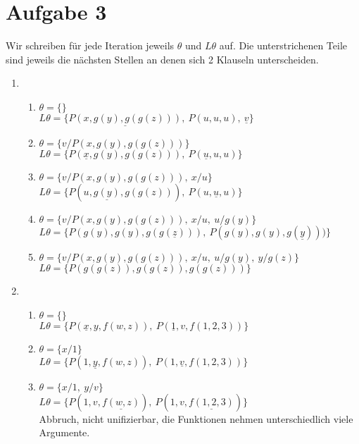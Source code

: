 \documentclass[a4paper,10pt]{article}
\begin{document}
\section*{Aufgabe 3}
Wir schreiben für jede Iteration jeweils $\theta$ und $L\theta$ auf. Die unterstrichenen Teile sind jeweils die nächsten Stellen an denen sich 2 Klauseln unterscheiden.

\begin{enumerate}[~~a)]
    \item
    \begin{enumerate}[~~1.]
      \item $\theta = \{\}$\\
            $L\theta = \{ \underline{P(x, g(y), g(g(z)))},~ P(u, u, u),~ \underline{v} \} $
      \item $\theta = \{ v/P(x, g(y), g(g(z))) \}$\\
            $L\theta = \{ P(\underline{x}, g(y), g(g(z))),~ P(\underline{u}, u, u)\} $
      \item $\theta = \{ v/P(x, g(y), g(g(z))),~ x/u \}$\\
            $L\theta = \{ P(u, \underline{g(y)}, g(g(z))),~ P(u, \underline{u}, u)\} $
      \item $\theta = \{ v/P(x, g(y), g(g(z))),~ x/u,~ u/g(y) \}$\\
            $L\theta = \{ P(g(y), g(y), g(g(\underline{z}))),~ P(g(y), g(y), g(\underline{y})))\} $
      \item $\theta = \{ v/P(x, g(y), g(g(z))),~ x/u,~ u/g(y),~ y/g(z)\}$\\
            $L\theta = \{ P(g(g(z)), g(g(z)), g(g(z)))\} $
    \end{enumerate}

    \item
    \begin{enumerate}[~~1.]
      \item $\theta = \{\}$\\
            $L\theta = \{ P(\underline{x}, y, f(w, z)),~ P(\underline{1}, v, f(1, 2, 3)) \}$
      \item $\theta = \{x/1\}$\\
            $L\theta = \{ P(1, \underline{y}, f(w, z)),~ P(1, \underline{v}, f(1, 2, 3)) \}$
      \item $\theta = \{x/1,~ y/v\}$\\
            $L\theta = \{ P(1, v, \underline{f(w, z)}),~ P(1, v, \underline{f(1, 2, 3)}) \}$ \\
            Abbruch, nicht unifizierbar, die Funktionen nehmen unterschiedlich viele Argumente.


\end{enumerate}
\end{enumerate}
\end{document}
